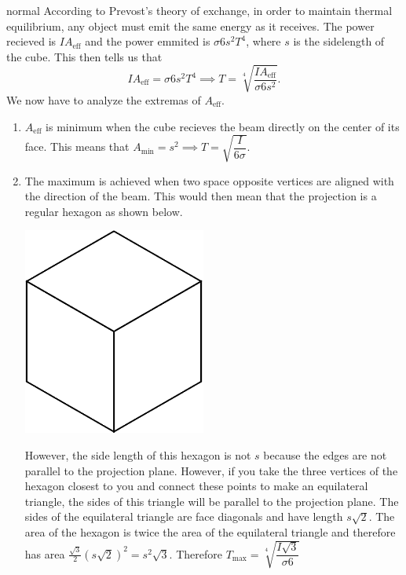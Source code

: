 \begin{solution}{normal}
According to Prevost’s theory of exchange, in order to maintain thermal equilibrium, any object must
emit the same energy as it receives. The power recieved is $IA_{\text{eff}}$ and the power emmited is $\sigma 6s^2 T^4$, where $s$ is the sidelength of the cube. This then tells us that 
\[IA_{\text{eff}} = \sigma 6s^2 T^4\implies T = \sqrt[4]{\frac{IA_{\text{eff}}}{\sigma 6s^2}}.\]
We now have to analyze the extremas of $A_{\text{eff}}$.
\begin{enumerate}
    \item $A_{\text{eff}}$ is minimum when the cube recieves the beam directly on the center of its face. This means that $A_{\text{min}} = s^2\implies T = \sqrt{\dfrac{I}{6\sigma}}$.
    \item The maximum is achieved when two space opposite vertices are aligned with the direction of the beam. This would then mean that the projection is a regular hexagon as shown below. 
    \begin{center}
    \includegraphics[width=6cm]{Hexagon_in_cube.svg.png}
    \end{center}
    However, the side length of this hexagon is not $s$ because the edges are not parallel to the projection plane. However, if you take the three vertices of the hexagon closest to you and connect these points to make an equilateral triangle, the sides of this triangle will be parallel to the projection plane. The sides of the equilateral triangle are face diagonals and have length $s\sqrt{2}$. The area of the hexagon is twice the area of the equilateral triangle and therefore has area $\frac{\sqrt{3}}{2}(s\sqrt{2})^2=s^2\sqrt{3}$. Therefore $T_{\text{max}}=\sqrt[4]{\dfrac{I\sqrt{3}}{\sigma 6}}$
\end{enumerate}

\end{solution}
